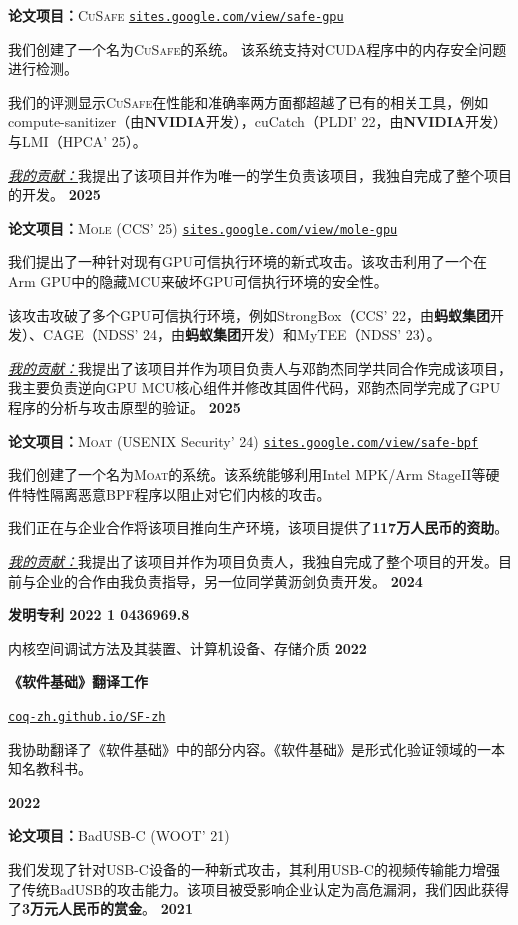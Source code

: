 \documentclass{resume}
\begin{document}
\begin{content}
	\textbf{论文项目：}\textsc{CuSafe} \enspace
	{\href{https://sites.google.com/view/safe-gpu/}{\texttt{sites.google.com/view/safe-gpu}}}

	{我们创建了一个名为\textsc{CuSafe}的系统。 该系统支持对CUDA程序中的内存安全问题进行检测。}

	{我们的评测显示\textsc{CuSafe}在性能和准确率两方面都超越了已有的相关工具，例如compute-sanitizer（由\textbf{NVIDIA}开发），cuCatch（PLDI’ 22，由\textbf{NVIDIA}开发）与LMI（HPCA’ 25）。}

	{\underline{\textit{我的贡献：}}我提出了该项目并作为唯一的学生负责该项目，我独自完成了整个项目的开发。}
	\hfill {\bf 2025}


	\textbf{论文项目：}\textsc{Mole} (CCS' 25) \enspace
	{\href{https://sites.google.com/view/mole-gpu}{\texttt{sites.google.com/view/mole-gpu}}}

	{我们提出了一种针对现有GPU可信执行环境的新式攻击。该攻击利用了一个在Arm GPU中的隐藏MCU来破坏GPU可信执行环境的安全性。}

	{该攻击攻破了多个GPU可信执行环境，例如StrongBox（CCS’ 22，由\textbf{蚂蚁集团}开发）、CAGE（NDSS’ 24，由\textbf{蚂蚁集团}开发）和MyTEE（NDSS’ 23）。}

	{\underline{\textit{我的贡献：}}我提出了该项目并作为项目负责人与邓韵杰同学共同合作完成该项目，我主要负责逆向GPU MCU核心组件并修改其固件代码，邓韵杰同学完成了GPU程序的分析与攻击原型的验证。}
	\hfill{\bf 2025}


	\textbf{论文项目：}\textsc{Moat} (USENIX Security' 24) \enspace
	{\href{https://sites.google.com/view/safe-bpf/}{\texttt{sites.google.com/view/safe-bpf}}}

	{我们创建了一个名为\textsc{Moat}的系统。该系统能够利用Intel MPK/Arm StageII等硬件特性隔离恶意BPF程序以阻止对它们内核的攻击。}

	{我们正在与企业合作将该项目推向生产环境，该项目提供了\textbf{117万人民币的资助}。}

	{\underline{\textit{我的贡献：}}我提出了该项目并作为项目负责人，我独自完成了整个项目的开发。目前与企业的合作由我负责指导，另一位同学黄沥剑负责开发。}
	\hfill {\bf 2024}

	\textbf{发明专利 2022 1 0436969.8}

	{内核空间调试方法及其装置、计算机设备、存储介质}
	\hfill {\bf 2022}

	\textbf{《软件基础》翻译工作} \enspace
	{\href{https://coq-zh.github.io/SF-zh/}{\texttt{coq-zh.github.io/SF-zh}}

		{我协助翻译了《软件基础》中的部分内容。《软件基础》是形式化验证领域的一本知名教科书。}}
	\hfill {\bf 2022}

	\textbf{论文项目：}BadUSB-C (WOOT' 21)

	{我们发现了针对USB-C设备的一种新式攻击，其利用USB-C的视频传输能力增强了传统BadUSB的攻击能力。该项目被受影响企业认定为高危漏洞，我们因此获得了\textbf{3万元人民币的赏金}。}
	\hfill {\bf 2021}


	\sectionlineskip
\end{content}
\end{document}
